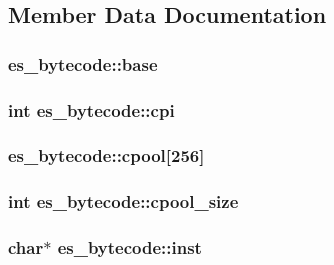\subsection{Member Data Documentation}
\hypertarget{structes__bytecode_aa7380d727ecddf7b2a01493909c2c9e8}{
\subsubsection[{base}]{ es\-\_\-bytecode\-::base}}\label{structes__bytecode_aa7380d727ecddf7b2a01493909c2c9e8}
\hypertarget{structes__bytecode_acfdfeb814740896faec5eac87710668b}{
\subsubsection[{cpi}]{\setlength{\rightskip}{0pt plus 5cm}int es\-\_\-bytecode\-::cpi}}\label{structes__bytecode_acfdfeb814740896faec5eac87710668b}
\hypertarget{structes__bytecode_a4a4d60218e393f7541561114e91e3412}{
\subsubsection[{cpool}]{ es\-\_\-bytecode\-::cpool\mbox{[}256\mbox{]}}}\label{structes__bytecode_a4a4d60218e393f7541561114e91e3412}
\hypertarget{structes__bytecode_af722cca8107019f0978e30cb2a7eb135}{
\subsubsection[{cpool\-\_\-size}]{\setlength{\rightskip}{0pt plus 5cm}int es\-\_\-bytecode\-::cpool\-\_\-size}}\label{structes__bytecode_af722cca8107019f0978e30cb2a7eb135}
\hypertarget{structes__bytecode_a066a52cfb1ee403ffe408ca986443beb}{
\subsubsection[{inst}]{\setlength{\rightskip}{0pt plus 5cm}char$\ast$ es\-\_\-bytecode\-::inst}}\label{structes__bytecode_a066a52cfb1ee403ffe408ca986443beb}
